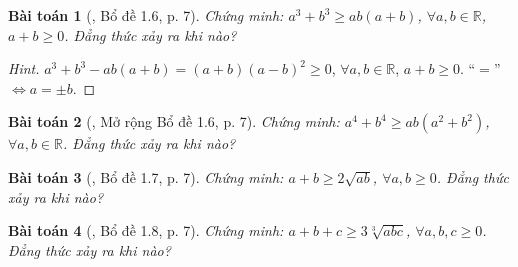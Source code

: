 \documentclass{article}
\numberwithin{equation}{section}
\newtheorem{baitoan}{Bài toán}[section]
\begin{document}
\begin{baitoan}[\cite{Son_Nghiep_Trung_Can2021}, Bổ đề 1.6, p. 7]
	Chứng minh: $a^3 + b^3\ge ab(a + b)$, $\forall a,b\in\mathbb{R}$, $a + b\ge 0$. Đẳng thức xảy ra khi nào?
\end{baitoan}

\begin{proof}[Hint]
	$a^3 + b^3 - ab(a + b) = (a + b)(a - b)^2\ge 0$, $\forall a,b\in\mathbb{R}$, $a + b\ge 0$. ``$=$'' $\Leftrightarrow a = \pm b$.
\end{proof}

\begin{baitoan}[\cite{Son_Nghiep_Trung_Can2021}, Mở rộng Bổ đề 1.6, p. 7]
	Chứng minh: $a^4 + b^4\ge ab(a^2 + b^2)$, $\forall a,b\in\mathbb{R}$. Đẳng thức xảy ra khi nào?
\end{baitoan}

\begin{baitoan}[\cite{Son_Nghiep_Trung_Can2021}, Bổ đề 1.7, p. 7]
	Chứng minh: $a + b\ge2\sqrt{ab}$, $\forall a,b\ge 0$. Đẳng thức xảy ra khi nào?
\end{baitoan}

\begin{baitoan}[\cite{Son_Nghiep_Trung_Can2021}, Bổ đề 1.8, p. 7]
	Chứng minh: $a + b + c\ge3\sqrt[3]{abc}$, $\forall a,b,c\ge 0$. Đẳng thức xảy ra khi nào?
\end{baitoan}




\printbibliography[heading=bibintoc]
	
\end{document}
